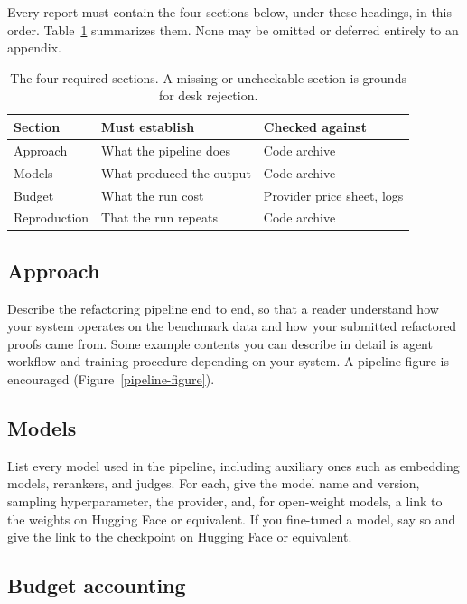\documentclass{article}
\begin{document}
Every report must contain the four sections below, under these headings, in this order. Table~\ref{required-table} summarizes them. None may be omitted or deferred entirely to an appendix.


\begin{table}[!ht]
  \caption{The four required sections. A missing or uncheckable section is grounds for desk rejection.}
  \label{required-table}
  \centering
  \begin{tabular}{lll}
    \toprule
    Section      & Must establish           & Checked against \\
    \midrule
    Approach     & What the pipeline does   & Code archive \\
    Models       & What produced the output & Code archive \\
    Budget       & What the run cost        & Provider price sheet, logs \\
    Reproduction & That the run repeats     & Code archive \\
    \bottomrule
  \end{tabular}
\end{table}


\subsection{Approach}


Describe the refactoring pipeline end to end, so that a reader understand how your system operates on the benchmark data and how your submitted refactored proofs came from. Some example contents you can describe in detail is agent workflow and training procedure depending on your system. A pipeline figure is encouraged (Figure~\ref{pipeline-figure}).



\subsection{Models}


List every model used in the pipeline, including auxiliary ones such as embedding models, rerankers, and judges. For each, give the model name and version, sampling hyperparameter, the provider, and, for open-weight models, a link to the weights on Hugging Face or equivalent. If you fine-tuned a model, say so and give the link to the checkpoint on Hugging Face or equivalent.


\subsection{Budget accounting}
\label{budget}
\end{document}
